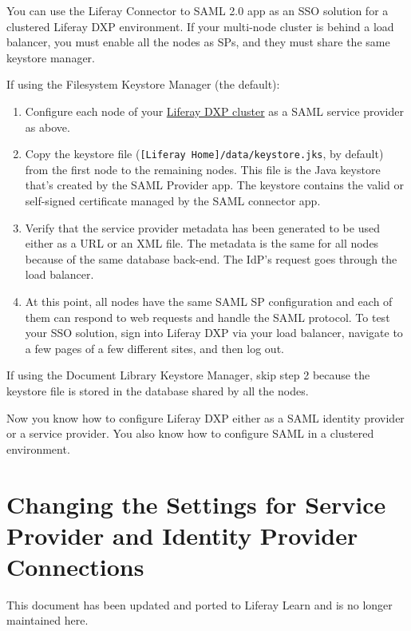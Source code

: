 You can use the Liferay Connector to SAML 2.0 app as an SSO solution for
a clustered Liferay DXP environment. If your multi-node cluster is
behind a load balancer, you must enable all the nodes as SPs, and they
must share the same keystore manager.

If using the Filesystem Keystore Manager (the default):

\begin{enumerate}
\def\labelenumi{\arabic{enumi}.}
\item
  Configure each node of your
  \href{/docs/7-2/deploy/-/knowledge_base/d/liferay-clustering}{Liferay
  DXP cluster} as a SAML service provider as above.
\item
  Copy the keystore file
  (\texttt{{[}Liferay\ Home{]}/data/keystore.jks}, by default) from the
  first node to the remaining nodes. This file is the Java keystore
  that's created by the SAML Provider app. The keystore contains the
  valid or self-signed certificate managed by the SAML connector app.
\item
  Verify that the service provider metadata has been generated to be
  used either as a URL or an XML file. The metadata is the same for all
  nodes because of the same database back-end. The IdP's request goes
  through the load balancer.
\item
  At this point, all nodes have the same SAML SP configuration and each
  of them can respond to web requests and handle the SAML protocol. To
  test your SSO solution, sign into Liferay DXP via your load balancer,
  navigate to a few pages of a few different sites, and then log out.
\end{enumerate}

If using the Document Library Keystore Manager, skip step 2 because the
keystore file is stored in the database shared by all the nodes.

Now you know how to configure Liferay DXP either as a SAML identity
provider or a service provider. You also know how to configure SAML in a
clustered environment.

\chapter{Changing the Settings for Service Provider and Identity
Provider
Connections}\label{changing-the-settings-for-service-provider-and-identity-provider-connections}

{This document has been updated and ported to Liferay Learn and is no
longer maintained here.}

